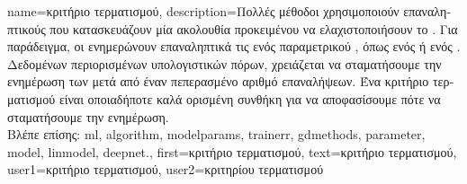 {name={\foreignlanguage{greek}{κριτήριο τερματισμού}},
	description={\foreignlanguage{greek}{Πολλές μέθοδοι} 
		 \foreignlanguage{greek}{χρησιμοποι\-ούν επαναληπτικούς}  
		\foreignlanguage{greek}{που κατασκευάζουν μία ακολουθία}  
		\foreignlanguage{greek}{προκειμένου να ελαχιστοποιήσουν το} . 
		\foreignlanguage{greek}{Για παράδειγμα, οι}  \foreignlanguage{greek}{ενημερώνουν 
		επαναληπτικά τις}  \foreignlanguage{greek}{ενός παραμετρικού} , 
		\foreignlanguage{greek}{όπως ενός}  \foreignlanguage{greek}{ή ενός} . 
		\foreignlanguage{greek}{Δεδομένων περιορισμένων υπολογιστικών πόρων, χρειάζεται να σταματήσουμε
		την ενημέρωση των}  \foreignlanguage{greek}{μετά από έναν
		πεπερασμένο αριθμό επαναλήψεων. Ένα κριτήριο τερματισμού είναι οποιαδήποτε καλά ορισμένη συνθήκη
		για να αποφασίσουμε πότε να σταματήσουμε την ενημέρωση.}  \\
		\foreignlanguage{greek}{Βλέπε επίσης:} \gls{ml}, \gls{algorithm}, \gls{modelparams}, \gls{trainerr}, \gls{gdmethods}, 
		\gls{parameter}, \gls{model}, \gls{linmodel}, \gls{deepnet}.},
	first={\foreignlanguage{greek}{κριτήριο τερματισμού}},
	text={\foreignlanguage{greek}{κριτήριο τερματισμού}},
	user1={\foreignlanguage{greek}{κριτήριο τερματισμού}}, %
	user2={\foreignlanguage{greek}{κριτηρίου τερματισμού}} %
}

